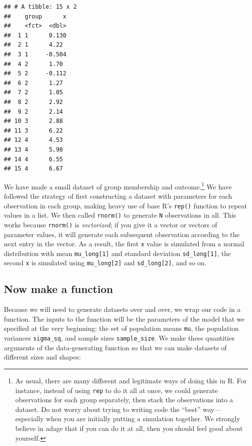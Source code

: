 \documentclass[
]{book}
\begin{document}
\begin{verbatim}
## # A tibble: 15 x 2
##    group      x
##    <fct>  <dbl>
##  1 1      0.130
##  2 1      4.22 
##  3 1     -0.504
##  4 2      1.70 
##  5 2     -0.112
##  6 2      1.27 
##  7 2      1.05 
##  8 2      2.92 
##  9 2      2.14 
## 10 3      2.88 
## 11 3      6.22 
## 12 4      4.53 
## 13 4      5.98 
## 14 4      6.55 
## 15 4      6.67
\end{verbatim}

We have made a small dataset of group membership and outcome.\footnote{As usual, there are many different and legitimate ways of doing this in R.
  For instance, instead of using \texttt{rep} to do it all at once, we could generate observations for each group separately, then stack the observations into a dataset.
  Do not worry about trying to writing code the ``best'' way---especially when you are initially putting a simulation together.
  We strongly believe in adage that if you can do it at all, then you should feel good about yourself.}
We have followed the strategy of first constructing a dataset with parameters for each observation in each group, making heavy use of base R's \texttt{rep()} function to repeat values in a list.
We then called \texttt{rnorm()} to generate \texttt{N} observations in all.
This works because \texttt{rnorm()} is \emph{vectorized}; if you give it a vector or vectors of parameter values, it will generate each subsequent observation according to the next entry in the vector. As a result, the first \texttt{x} value is simulated from a normal distribution with mean \texttt{mu\_long{[}1{]}} and standard deviation \texttt{sd\_long{[}1{]}}, the second \texttt{x} is simulated using \texttt{mu\_long{[}2{]}} and \texttt{sd\_long{[}2{]}}, and so on.

\subsection{Now make a function}\label{now-make-a-function}

Because we will need to generate datasets over and over, we wrap our code in a function.
The inputs to the function will be the parameters of the model that we specified at the very beginning: the set of population means \texttt{mu}, the population variances \texttt{sigma\_sq}, and sample sizes \texttt{sample\_size}. We make these quantities arguments of the data-generating function so that we can make datasets of different sizes and shapes:
\end{document}
